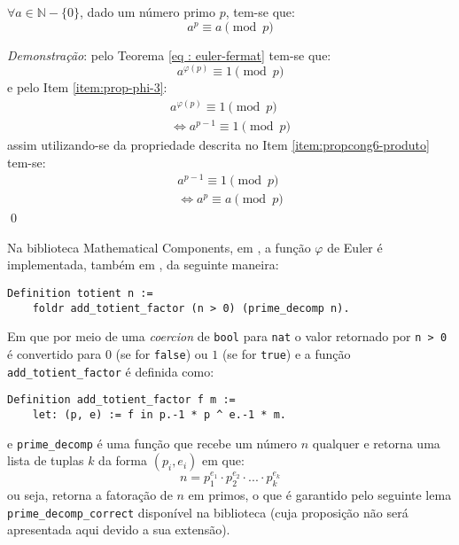 \begin{teorema}
\label{eq : pequeno-fermat}
$\forall a \in \mathbb{N} - \{0\}$, dado um número primo $p$, tem-se que:
    \begin{equation*}
        a^p \equiv a \pmod{p}
    \end{equation*}
\end{teorema}

\noindent
\textit{Demonstração}: pelo Teorema \ref{eq : euler-fermat} tem-se que:
\begin{equation*}
    a^{\varphi(p)} \equiv 1 \pmod{p}
\end{equation*}
e pelo Item \ref{item:prop-phi-3}:
\begin{align*}
    a^{\varphi(p)} \equiv 1 \pmod{p}
    \\
    \Longleftrightarrow a^{p-1} \equiv 1 \pmod{p}
\end{align*}
assim utilizando-se da propriedade descrita no Item \ref{item:propcong6-produto} tem-se:
\begin{align*}
    a^{p-1} \equiv 1 \pmod{p}
    \\
    \Longleftrightarrow a^{p} \equiv a \pmod{p}
\end{align*} \qed

Na biblioteca Mathematical Components, em \cite{mathcomp-prime}, a função $\varphi$ de Euler é implementada, também em \cite{mathcomp-prime}, da seguinte maneira:
\begin{lstlisting}[language=coq,frame=single,tabsize=1]
Definition totient n := 
    foldr add_totient_factor (n > 0) (prime_decomp n).
\end{lstlisting}
Em que por meio de uma \textit{coercion} de \lstinline[language = coq]{bool} para \lstinline[language = coq]{nat} o valor retornado por \lstinline[language = coq]{n > 0} é convertido para $0$ (se for \lstinline[language = coq]{false}) ou $1$ (se for \lstinline[language = coq]{true}) e a função \lstinline[language = coq]{add_totient_factor} é definida como:
\begin{lstlisting}[language=coq,frame=single,tabsize=1]
Definition add_totient_factor f m := 
    let: (p, e) := f in p.-1 * p ^ e.-1 * m.
\end{lstlisting}
e \lstinline[language = coq]{prime_decomp} é uma função que recebe um número $n$ qualquer e retorna uma lista de tuplas $k$ da forma $(p_i, e_i)$ em que:
    \begin{equation*}
        n = p_1^{e_1} \cdot p_2^{e_2} \cdot ... \cdot p_k^{e_k}
    \end{equation*}
ou seja, retorna a fatoração de $n$ em primos, o que é garantido pelo seguinte lema \lstinline[language = coq]{prime_decomp_correct} disponível na biblioteca (cuja proposição não será apresentada aqui devido a sua extensão).

